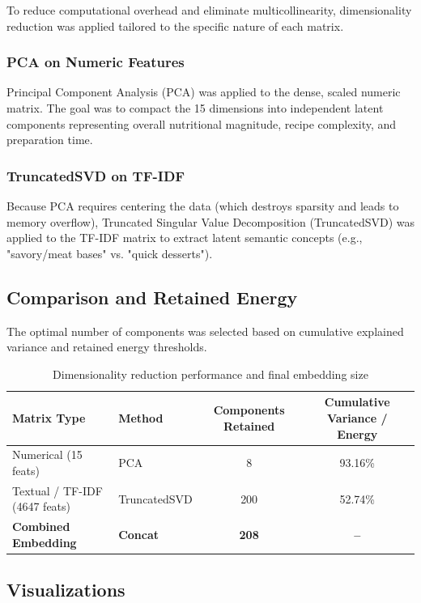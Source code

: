 \documentclass[11pt,a4paper]{article}
\begin{document}
To reduce computational overhead and eliminate multicollinearity, dimensionality reduction was applied tailored to the specific nature of each matrix.

\subsubsection{PCA on Numeric Features}
Principal Component Analysis (PCA) was applied to the dense, scaled numeric matrix. The goal was to compact the 15 dimensions into independent latent components representing overall nutritional magnitude, recipe complexity, and preparation time. 

\subsubsection{TruncatedSVD on TF-IDF}
Because PCA requires centering the data (which destroys sparsity and leads to memory overflow), Truncated Singular Value Decomposition (TruncatedSVD) was applied to the TF-IDF matrix to extract latent semantic concepts (e.g., "savory/meat bases" vs. "quick desserts").

\subsection{Comparison and Retained Energy}

The optimal number of components was selected based on cumulative explained variance and retained energy thresholds.

\begin{table}[H]
\centering
\begin{tabular}{llcc}
\toprule
\textbf{Matrix Type} & \textbf{Method} & \textbf{Components Retained} & \textbf{Cumulative Variance / Energy} \\
\midrule
Numerical (15 feats) & PCA & 8 & 93.16\% \\
Textual / TF-IDF (4647 feats) & TruncatedSVD & 200 & 52.74\% \\
\midrule
\textbf{Combined Embedding} & \textbf{Concat} & \textbf{208} & \textbf{--} \\
\bottomrule
\end{tabular}
\caption{Dimensionality reduction performance and final embedding size}
\label{tab:dim_reduction}
\end{table}

\subsection{Visualizations}
\end{document}
